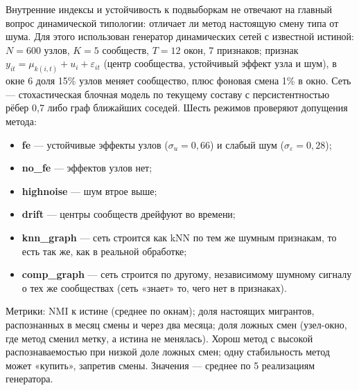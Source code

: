 \documentclass[11pt,a4paper]{article}
\providecommand{\tightlist}{\setlength{\itemsep}{1pt}\setlength{\parskip}{0pt}}
\begin{document}
Внутренние индексы и устойчивость к подвыборкам не отвечают на главный вопрос динамической типологии: отличает ли метод настоящую смену типа от шума. Для этого использован генератор динамических сетей с известной истиной: \(N = 600\) узлов, \(K = 5\) сообществ, \(T = 12\) окон, 7 признаков; признак \(y_{it} = \mu_{k(i,t)} + u_i + \varepsilon_{it}\) (центр сообщества, устойчивый эффект узла и шум), в окне 6 доля 15\% узлов меняет сообщество, плюс фоновая смена 1\% в окно. Сеть --- стохастическая блочная модель по текущему составу с персистентностью рёбер 0,7 либо граф ближайших соседей. Шесть режимов проверяют допущения метода:

\begin{itemize}
\tightlist
\item
  \textbf{fe} --- устойчивые эффекты узлов (\(\sigma_u = 0{,}66\)) и слабый шум (\(\sigma_\varepsilon = 0{,}28\));
\item
  \textbf{no\_fe} --- эффектов узлов нет;
\item
  \textbf{highnoise} --- шум втрое выше;
\item
  \textbf{drift} --- центры сообществ дрейфуют во времени;
\item
  \textbf{knn\_graph} --- сеть строится как kNN по тем же шумным признакам, то есть так же, как в реальной обработке;
\item
  \textbf{comp\_graph} --- сеть строится по другому, независимому шумному сигналу о тех же сообществах (сеть «знает» то, чего нет в признаках).
\end{itemize}

Метрики: NMI к истине (среднее по окнам); доля настоящих мигрантов, распознанных в месяц смены и через два месяца; доля ложных смен (узел-окно, где метод сменил метку, а истина не менялась). Хорош метод с высокой распознаваемостью при низкой доле ложных смен; одну стабильность метод может «купить», запретив смены. Значения --- среднее по 5 реализациям генератора.

\begingroup\footnotesize\setlength{\tabcolsep}{4pt}
\end{document}

